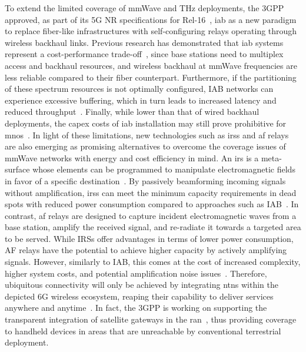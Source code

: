 To extend the limited coverage of mmWave and THz deployments, the 3GPP approved, as part of its 5G NR specifications for Rel-16~\cite{3gpp_38_874}, \gls{iab} as a new paradigm to replace fiber-like infrastructures with self-configuring relays operating through wireless backhaul links.
Previous research has demonstrated that \gls{iab} systems represent a cost-performance trade-off~\cite{polese2020integrated}, since base stations need to multiplex access and backhaul resources, and wireless backhaul at mmWave frequencies are less reliable compared to their fiber counterpart.
Furthermore, if the partitioning of these spectrum resources is not optimally configured, IAB networks can experience excessive buffering, which in turn leads to increased latency and reduced throughput~\cite{8514996}. Finally, while lower than that of wired backhaul deployments, the \gls{capex} costs of \gls{iab} installation may still prove prohibitive for \glspl{mno}~\cite{chaoub20216g}.
In light of these limitations, new technologies such as \glspl{irs} and \gls{af} relays are also emerging as promising alternatives to overcome the coverage issues of mmWave networks with energy and cost efficiency in mind.
An \gls{irs} is a meta-surface whose elements can be programmed to manipulate electromagnetic fields in favor of a specific destination~\cite{wu2021intelligent}. By passively beamforming incoming signals without amplification, \glspl{irs} can meet the minimum capacity requirements in dead spots with reduced power consumption compared to approaches such as IAB~\cite{bjornson2019intelligent}. In contrast, \gls{af} relays are designed to capture incident electromagnetic waves from a base station, amplify the received signal, and re-radiate it towards a targeted area to be served.
While IRSs offer advantages in terms of lower power consumption, AF relays have the potential to achieve higher capacity by actively amplifying signals. However, similarly to IAB, this comes at the cost of increased complexity, higher system costs, and potential amplification noise issues~\cite{huang2019reconfigurable}.
Therefore, ubiquitous connectivity will only be achieved by integrating \glspl{ntn} within the depicted 6G wireless ecosystem, reaping their capability to deliver services anywhere and anytime~\cite{8766143}. In fact, the 3GPP is working on supporting the transparent integration of satellite gateways in the \gls{ran}~\cite{38821}, thus providing coverage to handheld devices in areas that are unreachable by conventional terrestrial deployment.

